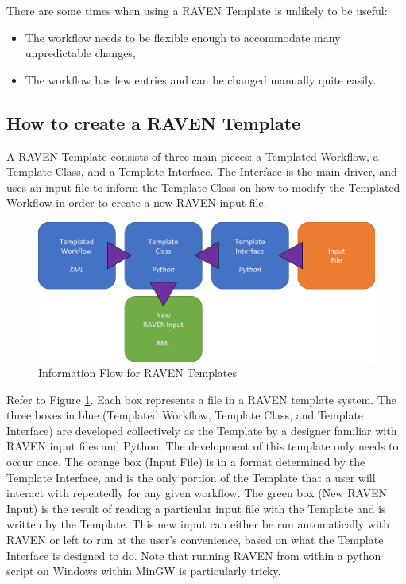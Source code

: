 There are some times when using a RAVEN Template is unlikely to be useful:
%
\begin{itemize}
  \item The workflow needs to be flexible enough to accommodate many unpredictable changes,
  \item The workflow has few entries and can be changed manually quite easily.
\end{itemize}

\subsection{How to create a RAVEN Template}
%
A RAVEN Template consists of three main pieces: a Templated Workflow, a Template Class, and a Template Interface. The
%
Interface is the main driver, and uses an input file to inform the Template Class on how to modify the Templated
%
Workflow in order to create a new RAVEN input file.

\begin{figure}[h!]
 \centering
 \includegraphics[width=\textwidth]{pics/TemplateWorkflow.png}
 \caption{Information Flow for RAVEN Templates}
 \label{fig:raven template workflow}
\end{figure}

Refer to Figure \ref{fig:raven template workflow}. Each box represents a file in a RAVEN template system. The three
%
boxes in blue (Templated Workflow, Template Class, and Template Interface) are developed collectively as the Template
%
by a designer familiar with RAVEN input files and Python. The development of this template only needs to occur once. The
%
orange box (Input File) is in a format determined by the Template Interface, and is the only portion of the Template
%
that a user will interact with repeatedly for any given workflow. The green box (New RAVEN Input) is the result of
%
reading a particular input file with the Template and is written by the Template. This new input can either be run
%
automatically with RAVEN or left to run at the user's convenience, based on what the Template Interface is designed to
%
do. Note that running RAVEN from within a python script on Windows within MinGW is particularly tricky.
\\

